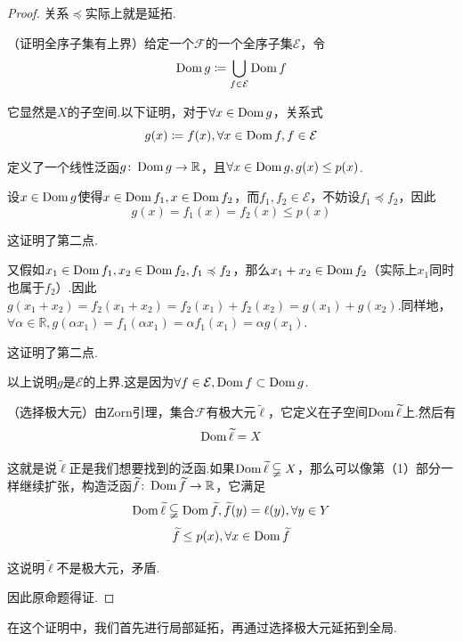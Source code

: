 \begin{proof}
关系$\preccurlyeq$实际上就是延拓.

（证明全序子集有上界）给定一个$\mathcal{F}$的一个全序子集$\mathcal{E}$，令
$$\operatorname{Dom} g\coloneqq \bigcup_{f\in \mathcal{E}}\operatorname{Dom} f$$

它显然是$X$的子空间.以下证明，对于$\forall x\in \operatorname{Dom} g$，关系式
$$g(x)\coloneqq f(x), \forall x\in \operatorname{Dom} f, f\in \mathcal{E}$$

定义了一个线性泛函$g\colon \operatorname{Dom} g\rightarrow \mathbb{R}$，且$\forall x\in\operatorname{Dom} g,g(x)\leq p(x)$.

设$x\in \operatorname{Dom} g$使得$x\in \operatorname{Dom} f_1,x\in \operatorname{Dom} f_2$，而$f_1,f_2\in\mathcal{E}$，不妨设$f_1\preccurlyeq f_2$，因此
$$g(x)=f_1(x)=f_2(x)\leq p(x)$$

这证明了第二点.

又假如$x_1\in\operatorname{Dom} f_1,x_2\in\operatorname{Dom} f_2,f_1\preccurlyeq f_2$，那么$x_1+x_2\in\operatorname{Dom} f_2$（实际上$x_1$同时也属于$f_2$）.因此$g(x_1+x_2)=f_2(x_1+x_2)=f_2(x_1)+f_2(x_2)=g(x_1)+g(x_2)$.同样地，$\forall \alpha \in \mathbb{R},g(\alpha x_1)=f_1(\alpha x_1)=\alpha f_1(x_1)=\alpha g(x_1)$.

这证明了第二点.

以上说明$g$是$\mathcal{E}$的上界.这是因为$\forall f\in \mathcal{E},\operatorname{Dom} f\subset \operatorname{Dom} g$.

（选择极大元）由Zorn引理，集合$\mathcal{F}$有极大元$\widetilde{\ell}$，它定义在子空间$\operatorname{Dom} \widetilde{\ell}$上.然后有
$$\operatorname{Dom} \widetilde{\ell}=X$$

这就是说$\widetilde{\ell}$正是我们想要找到的泛函.如果$\operatorname{Dom} \widetilde{\ell}\subsetneqq X$，那么可以像第（1）部分一样继续扩张，构造泛函$\widetilde{f}\colon \operatorname{Dom} \widetilde{f}\rightarrow \mathbb{R}$，它满足
$$\operatorname{Dom} \widetilde{\ell}\subsetneqq \operatorname{Dom} \widetilde{f},\widetilde{f}(y)=\ell(y),\forall y\in Y$$
$$\widetilde{f}\leq p(x),\forall x\in \operatorname{Dom} \widetilde{f}$$

这说明$\widetilde{\ell}$不是极大元，矛盾.

因此原命题得证.

\end{proof}

在这个证明中，我们首先进行局部延拓，再通过选择极大元延拓到全局.

